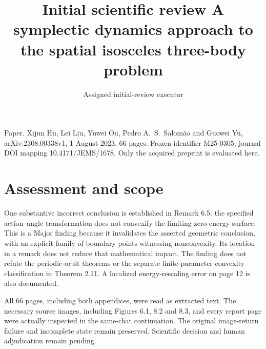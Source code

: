 \documentclass[10pt]{article}
\title{Initial scientific review
A symplectic dynamics approach to the spatial isosceles three-body problem}
\author{Assigned initial-review executor}
\date{}
\begin{document}
\maketitle
Paper. Xijun Hu, Lei Liu, Yuwei Ou, Pedro A. S. Salomão and Guowei Yu, arXiv:2308.00338v1, 1 August 2023, 66 pages. Frozen identifier M25-0305; journal DOI mapping 10.4171/JEMS/1678. Only the acquired preprint is evaluated here.\par
\section*{Assessment and scope}
One substantive incorrect conclusion is established in Remark 6.5: the specified action–angle transformation does not convexify the limiting zero-energy surface. This is a Major finding because it invalidates the asserted geometric conclusion, with an explicit family of boundary points witnessing nonconvexity. Its location in a remark does not reduce that mathematical impact. The finding does not refute the periodic-orbit theorems or the separate finite-parameter convexity classification in Theorem 2.11. A localized energy-rescaling error on page 12 is also documented.\par
All 66 pages, including both appendices, were read as extracted text. The necessary source images, including Figures 6.1, 8.2 and 8.3, and every report page were actually inspected in the same-chat continuation. The original image-return failure and incomplete state remain preserved. Scientific decision and human adjudication remain pending.\par
\end{document}
